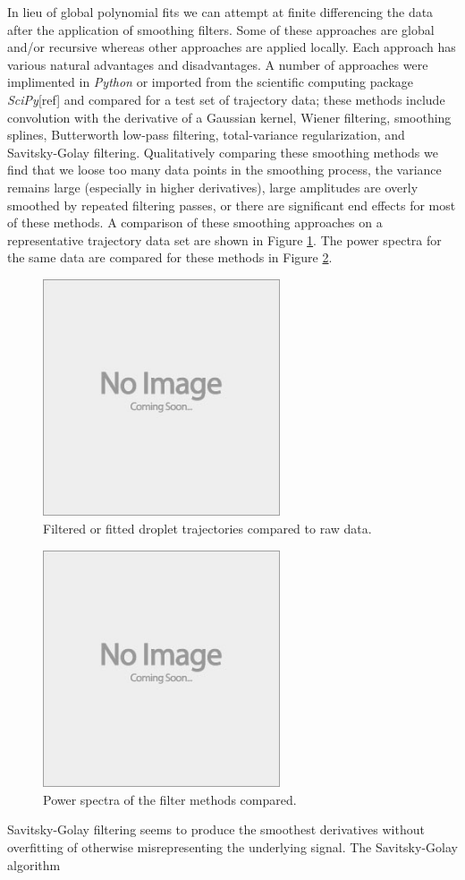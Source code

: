 \documentclass{jfm}
\begin{document}
In lieu of global polynomial fits we can attempt at finite differencing the data after the application of smoothing filters. Some of these approaches are global and/or recursive whereas other approaches are applied locally. Each approach has various natural advantages and disadvantages. A number of approaches were implimented in \emph{Python} or imported from the scientific computing package \emph{SciPy}[ref] and compared for a test set of trajectory data; these methods include convolution with the derivative of a Gaussian kernel, Wiener filtering, smoothing splines, Butterworth low-pass filtering, total-variance regularization, and Savitsky-Golay filtering. Qualitatively comparing these smoothing methods we find that we loose too many data points in the smoothing process, the variance remains large (especially in higher derivatives), large amplitudes are overly smoothed by repeated filtering passes, or there are significant end effects for most of these methods. A comparison of these smoothing approaches on a representative trajectory data set are shown in Figure \ref{fig:filters}. The power spectra for the same data are compared for these methods in Figure \ref{fig:power_spectra}.

\begin{figure}
  \centerline{\includegraphics[height=7cm,width=7cm]{e88_1_thumb.jpg}}
  \caption{Filtered or fitted droplet trajectories compared to raw data.}
\label{fig:filters}
\end{figure}

\begin{figure}
  \centerline{\includegraphics[height=7cm,width=7cm]{e88_1_thumb.jpg}}
  \caption{Power spectra of the filter methods compared.}
\label{fig:power_spectra}
\end{figure}

Savitsky-Golay filtering seems to produce the smoothest derivatives without overfitting of otherwise misrepresenting the underlying signal. The Savitsky-Golay algorithm
\end{document}
